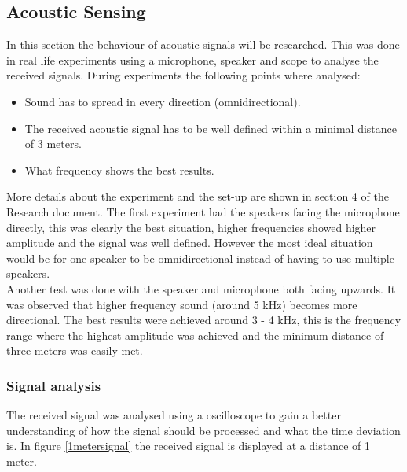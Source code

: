 \documentclass[10pt,a4paper]{article}
\begin{document}
\subsection{Acoustic Sensing}
In this section the behaviour of acoustic signals will be researched. This was done in real life experiments using a microphone, speaker and scope to analyse the received signals. During experiments the following points where analysed:

\begin{itemize}
\item Sound has to spread in every direction (omnidirectional).
\item The received acoustic signal has to be well defined within a minimal distance of 3 meters.
\item What frequency shows the best results.
\end{itemize}

More details about the experiment and the set-up are shown in section 4 of the Research document. The first experiment had the speakers facing the microphone directly, this was clearly the best situation, higher frequencies showed higher amplitude and the signal was well defined. However the most ideal situation would be for one speaker to be omnidirectional instead of having to use multiple speakers.  \\
Another test was done with the speaker and microphone both facing upwards. It was observed that higher frequency sound (around 5 kHz) becomes more directional. The best results were achieved around 3 - 4 kHz, this is the frequency range where the highest amplitude was achieved and the minimum distance of three meters was easily met.

\subsubsection{Signal analysis}
The received signal was analysed using a oscilloscope to gain a better understanding of how the signal should be processed and what the time deviation is. In figure \ref{1metersignal} the received signal is displayed at a distance of 1 meter.
\end{document}
